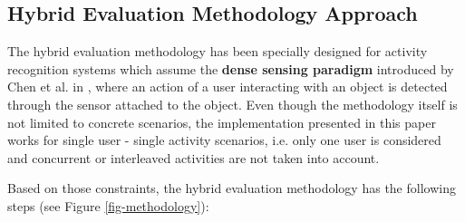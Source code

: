
\subsection{Hybrid Evaluation Methodology Approach}

\begin{comment}
 - Describe target scenario: dense sensing, single user - single activity
 - Explain in detail the steps: survey, script writing, sensor modelling, synthetic dataset generator 
\end{comment}

The hybrid evaluation methodology has been specially designed for activity recognition systems which assume the \textbf{dense sensing paradigm} introduced by Chen et al. in \cite{Chen2012}, where an action of a user interacting with an object is detected through the sensor attached to the object. Even though the methodology itself is not limited to concrete scenarios, the implementation presented in this paper works for single user - single activity scenarios, i.e. only one user is considered and concurrent or interleaved activities are not taken into account. 

Based on those constraints, the hybrid evaluation methodology has the following steps (see Figure \ref{fig-methodology}):

